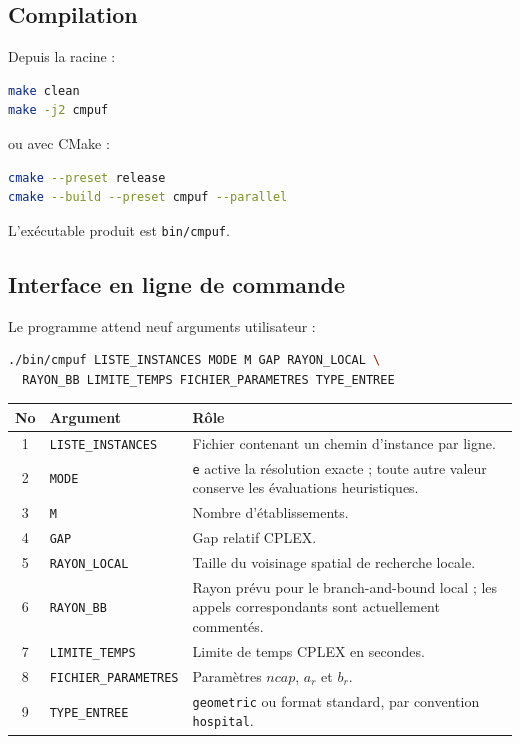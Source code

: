 \documentclass[11pt,a4paper]{article}
\newcommand{\code}[1]{\texttt{#1}}
\begin{document}
\subsection{Compilation}

Depuis la racine :
\begin{lstlisting}[language=bash]
make clean
make -j2 cmpuf
\end{lstlisting}

ou avec CMake :
\begin{lstlisting}[language=bash]
cmake --preset release
cmake --build --preset cmpuf --parallel
\end{lstlisting}

L'exécutable produit est \code{bin/cmpuf}.

\subsection{Interface en ligne de commande}

Le programme attend neuf arguments utilisateur :
\begin{lstlisting}[language=bash]
./bin/cmpuf LISTE_INSTANCES MODE M GAP RAYON_LOCAL \
  RAYON_BB LIMITE_TEMPS FICHIER_PARAMETRES TYPE_ENTREE
\end{lstlisting}

\begin{longtable}{clp{8.8cm}}
\toprule
No & Argument & Rôle\\
\midrule
\endhead
1 & \code{LISTE\_INSTANCES} & Fichier contenant un chemin d'instance par
ligne.\\
2 & \code{MODE} & \code{e} active la résolution exacte ; toute autre valeur
conserve les évaluations heuristiques.\\
3 & \code{M} & Nombre d'établissements.\\
4 & \code{GAP} & Gap relatif CPLEX.\\
5 & \code{RAYON\_LOCAL} & Taille du voisinage spatial de recherche locale.\\
6 & \code{RAYON\_BB} & Rayon prévu pour le branch-and-bound local ; les appels
correspondants sont actuellement commentés.\\
7 & \code{LIMITE\_TEMPS} & Limite de temps CPLEX en secondes.\\
8 & \code{FICHIER\_PARAMETRES} & Paramètres $ncap$, $a_r$ et $b_r$.\\
9 & \code{TYPE\_ENTREE} & \code{geometric} ou format standard, par convention
\code{hospital}.\\
\bottomrule
\end{longtable}
\end{document}
